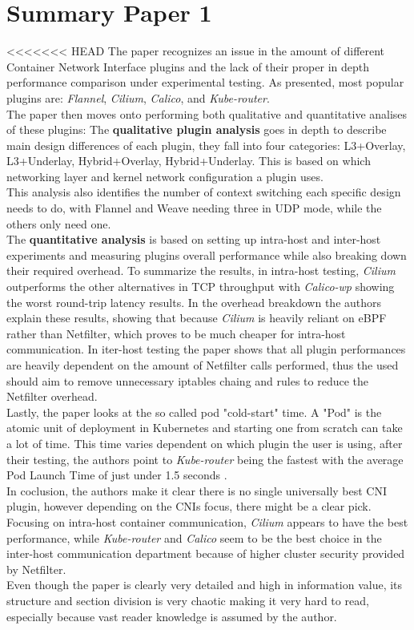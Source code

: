 \section{Summary Paper 1}%
\label{sec:Summary Paper 1}
<<<<<<< HEAD
The paper recognizes an issue in the amount of different Container Network Interface plugins and the lack of their  proper in depth performance comparison under experimental testing.
As presented, most popular plugins are: \textit{Flannel}, \textit{Cilium}, \textit{Calico}, and \textit{Kube-router}.\\
The paper then moves onto performing both qualitative and quantitative analises of these plugins:
The \textbf{qualitative plugin analysis} goes in depth to describe main design differences of each plugin, they fall into four categories: L3+Overlay, L3+Underlay, Hybrid+Overlay, Hybrid+Underlay. This is based on which networking layer and kernel network configuration a plugin uses. \\This analysis also identifies the number of context switching each specific design needs to do, with Flannel and Weave needing three in UDP mode, while the others only need one.\\
The \textbf{quantitative analysis} is based on setting up intra-host and inter-host experiments and measuring plugins overall performance while also breaking down their required overhead. To summarize the results, in intra-host testing, \textit{Cilium} outperforms the other alternatives in TCP throughput with \textit{Calico-wp} showing the worst round-trip latency results. In the overhead breakdown the authors explain these results, showing that because \textit{Cilium} is heavily reliant on eBPF rather than Netfilter, which proves to be much cheaper for intra-host communication. In iter-host testing
the paper shows that all plugin performances are heavily dependent on the amount of Netfilter calls performed, thus the used should aim to remove unnecessary iptables chaing and rules to reduce the Netfilter overhead.\\
Lastly, the paper looks at the so called pod "cold-start" time. A "Pod" is the atomic unit of deployment in Kubernetes \cite{C1} and starting one from scratch can take a lot of time.
This time varies dependent on which plugin the user is using, after their testing, the authors point to \textit{Kube-router} being the fastest with the average Pod Launch Time of just under 1.5 seconds \cite{C1}.\\
In coclusion, the authors make it clear there is no single universally best CNI plugin, however depending on the CNIs focus, there might be a clear pick. Focusing on intra-host container communication, \textit{Cilium} appears to have the best performance, while \textit{Kube-router} and \textit{Calico} seem to be the best choice in the inter-host communication department because of higher cluster security provided by Netfilter.\\Even though the paper is clearly very detailed and high in information value, its structure and section division is very chaotic making it very hard to read, especially because vast reader knowledge is assumed by the author.

